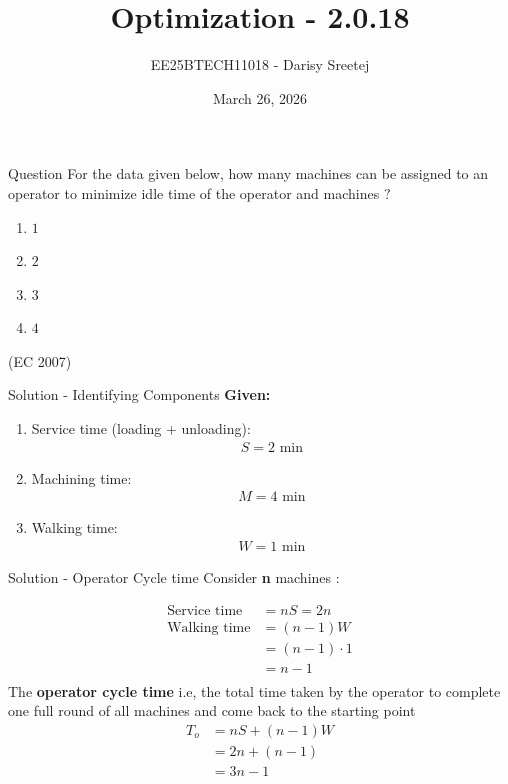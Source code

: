 \documentclass{beamer}
\title %
{Optimization - 2.0.18}
\date{March 26, 2026}
\author %
{EE25BTECH11018 - Darisy Sreetej}
\begin{document}
\frame{\titlepage}

\begin{frame}{Question}
For the data given below, how many machines can be assigned to an operator to
minimize idle time of the operator and machines $?$

\quad
 \begin{enumerate}

\item   $1$ 
\item   $2$
 \item $3$
\item  $4$

 \end{enumerate}
 \hfill(EC 2007) 
\end{frame}
\begin{frame}{Solution - Identifying Components}
\textbf{Given:}
\begin{enumerate}
  
    \item Service time (loading + unloading): 
    \begin{align}
    S = 2 \text{ min}
    \end{align}
    
    \item Machining time: 
    \begin{align}
    M = 4 \text{ min}
    \end{align}
    
    \item Walking time: 
    \begin{align}
    W = 1 \text{ min}
\end{align}
\end{enumerate}
\end{frame}
\begin{frame}{Solution - Operator Cycle time}
 Consider \textbf{n} machines :

\begin{align*}
\text{Service time} &= nS = 2n \\
\text{Walking time} &= (n-1)W \\
&= (n-1)\cdot 1 \\
&= n-1 \\
\end{align*}
The \textbf{operator cycle time} i.e, the total time taken by the operator to complete one full round of all machines and come back to the starting point
\begin{align*}
 T_o &= nS + (n-1)W \\
&= 2n + (n-1) \\
&= 3n - 1
\end{align*}
\end{frame}
\end{document}

